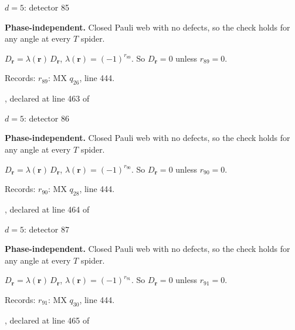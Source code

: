 \label{d5_det085}
{\Large $d=5$: detector 85}\par
\textbf{Phase-independent.} Closed Pauli web with no defects, so the check holds for any angle at every $T$ spider.
\begin{center}
\end{center}
\vspace{-1mm}
$D_{\boldsymbol r}=\lambda(\boldsymbol r)\,D_{\boldsymbol r}$, \quad $\lambda(\boldsymbol r)=(-1)^{r_{89}}$. \qquad So $D_{\boldsymbol r}=0$ unless $r_{89}=0$.
\par\smallskip\begin{minipage}{.98\linewidth}\small Records: $r_{89}$: MX $q_{26}$, line 444.\end{minipage}
\vfill
{\footnotesize\texttt{}, declared at line 463 of \texttt{}}
\newpage

\label{d5_det086}
{\Large $d=5$: detector 86}\par
\textbf{Phase-independent.} Closed Pauli web with no defects, so the check holds for any angle at every $T$ spider.
\begin{center}
\end{center}
\vspace{-1mm}
$D_{\boldsymbol r}=\lambda(\boldsymbol r)\,D_{\boldsymbol r}$, \quad $\lambda(\boldsymbol r)=(-1)^{r_{90}}$. \qquad So $D_{\boldsymbol r}=0$ unless $r_{90}=0$.
\par\smallskip\begin{minipage}{.98\linewidth}\small Records: $r_{90}$: MX $q_{28}$, line 444.\end{minipage}
\vfill
{\footnotesize\texttt{}, declared at line 464 of \texttt{}}
\newpage

\label{d5_det087}
{\Large $d=5$: detector 87}\par
\textbf{Phase-independent.} Closed Pauli web with no defects, so the check holds for any angle at every $T$ spider.
\begin{center}
\end{center}
\vspace{-1mm}
$D_{\boldsymbol r}=\lambda(\boldsymbol r)\,D_{\boldsymbol r}$, \quad $\lambda(\boldsymbol r)=(-1)^{r_{91}}$. \qquad So $D_{\boldsymbol r}=0$ unless $r_{91}=0$.
\par\smallskip\begin{minipage}{.98\linewidth}\small Records: $r_{91}$: MX $q_{30}$, line 444.\end{minipage}
\vfill
{\footnotesize\texttt{}, declared at line 465 of \texttt{}}
\newpage

